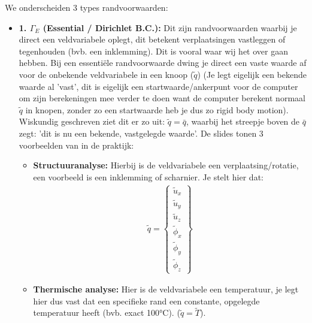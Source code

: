 \documentclass[a4paper,11pt,twoside]{report}
\begin{document}
We onderscheiden 3 types randvoorwaarden:
\begin{itemize}
    \item \textbf{1. {\color{yellow}$\Gamma_E$} (Essential / Dirichlet B.C.):} Dit zijn
          randvoorwaarden waarbij je direct een veldvariabele oplegt, dit betekent verplaatsingen
          vastleggen of tegenhouden (bvb. een inklemming). Dit is vooral waar wij het over gaan hebben.
          \newline
          \newline
          Bij een essentiële randvoorwaarde dwing je direct een vaste waarde af voor de onbekende
          veldvariabele in een knoop ($\tilde{q}$) (Je legt eigelijk een bekende waarde al 'vast', dit is
          eigelijk een startwaarde/ankerpunt voor de computer om zijn berekeningen mee verder te doen want
          de computer berekent normaal $\tilde{q}$ in knopen, zonder zo een startwaarde heb je dus zo
          rigid body motion). Wiskundig geschreven ziet dit er zo uit: $\tilde{q} = \bar{q}$, waarbij het
          streepje boven de $\bar{q}$ zegt: 'dit is nu een bekende, vastgelegde waarde'. De slides tonen 3
          voorbeelden van in de praktijk:
          \begin{itemize}
              \item \textbf{Structuuranalyse:} Hierbij is de veldvariabele een verplaatsing/rotatie, een
                    voorbeeld is een inklemming of scharnier. Je stelt hier dat:
                    \begin{align*}
                        \tilde{q} =
                        \begin{Bmatrix}
                            \tilde{u}_{x}    \\
                            \tilde{u}_{y}    \\
                            \tilde{u}_{z}    \\
                            \tilde{\phi}_{x} \\
                            \tilde{\phi}_{y} \\
                            \tilde{\phi}_{z}
                        \end{Bmatrix}
                    \end{align*}
              \item \textbf{Thermische analyse:} Hier is de veldvariabele een temperatuur, je legt hier dus
                    vast dat een specifieke rand een constante, opgelegde temperatuur heeft (bvb. exact 100°C).
                    ($\tilde{q} = \tilde{T}$).

\end{itemize}
\end{itemize}
\end{document}
